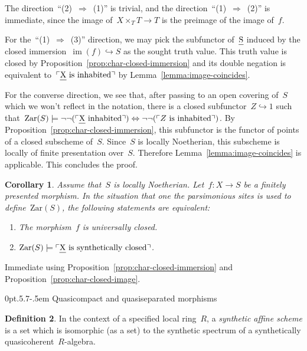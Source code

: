 \documentclass[10pt,reqno,a4paper]{amsbook}
\makeatletter
\theoremstyle{definition}
\newtheorem{defn}{Definition}[section]
\theoremstyle{plain}
\newtheorem{cor}[defn]{Corollary}
\theoremstyle{remark}
\let\oldul\ul
\renewcommand{\ul}[1]{\text{\oldul{$#1$}}}
\newcommand{\Zar}{\mathrm{Zar}}
\DeclareMathOperator{\im}{im}
\newcommand{\?}{\,{:}\,}
\renewcommand{\_}{\mathpunct{.}\,}
\newcommand{\speak}[1]{\ulcorner\text{\textnormal{#1}}\urcorner}
\renewenvironment{proof}[1][\proofname]{\par
  \pushQED{\qed}%
  \normalfont \topsep6\p@\@plus6\p@\relax
  \trivlist
  \item[\hskip\labelsep
        \itshape
    #1\@addpunct{.}]\ignorespaces
}{%
  \popQED\endtrivlist\@endpefalse
}
\def\subsection{\@startsection{subsection}{2}%
  {0pt}{.5\linespacing\@plus.7\linespacing}{-.5em}%
  {\normalfont\bfseries}}
\makeatother
\begin{document}
\begin{proof}The direction~``(2)~$\Rightarrow$~(1)'' is trivial, and the
direction~``(1)~$\Rightarrow$~(2)'' is immediate, since the image of~$X
\times_T T \to T$ is the preimage of the image of~$f$.

For the~``(1)~$\Rightarrow$~(3)'' direction, we may pick the subfunctor
of~$\ul{S}$ induced by the closed immersion~$\im(f) \hookrightarrow S$ as the
sought truth value. This truth value is closed by
Proposition~\ref{prop:char-closed-immersion} and its double negation is
equivalent to~$\speak{$\ul{X}$ is inhabited}$ by
Lemma~\ref{lemma:image-coincides}.

For the converse direction, we see that, after passing to an open covering
of~$S$ which we won't reflect in the notation, there is a closed subfunctor~$Z
\hookrightarrow 1$ such that~$\Zar(S) \models \neg\neg(\speak{$\ul{X}$
inhabited}) \Leftrightarrow \neg\neg(\speak{$Z$ is inhabited})$. By
Proposition~\ref{prop:char-closed-immersion}, this subfunctor is the functor of
points of a closed subscheme of~$S$. Since~$S$ is locally Noetherian, this
subscheme is locally of finite presentation over~$S$. Therefore
Lemma~\ref{lemma:image-coincides} is applicable. This concludes the proof.
\end{proof}

\begin{cor}Assume that~$S$ is locally Noetherian. Let~$f : X \to S$ be a
finitely presented morphism. In the situation that one the parsimonious
sites is used to define~$\Zar(S)$, the following statements are equivalent:
\begin{enumerate}
\item The morphism~$f$ is universally closed.
\item $\Zar(S) \models \speak{$\ul{X}$ is synthetically closed}$.
\end{enumerate}
\end{cor}

\begin{proof}Immediate using Proposition~\ref{prop:char-closed-immersion} and
Proposition~\ref{prop:char-closed-image}.
\end{proof}


\subsection{Quasicompact and quasiseparated morphisms}
\label{sect:qc-qs-morphisms}

\begin{defn}\label{defn:synthetic-affine-scheme}
In the context of a specified local ring~$R$,
a \emph{synthetic affine scheme} is a set which is isomorphic (as a set)
to the synthetic spectrum of a synthetically
quasicoherent~$R$-algebra.
\end{defn}
\end{document}
